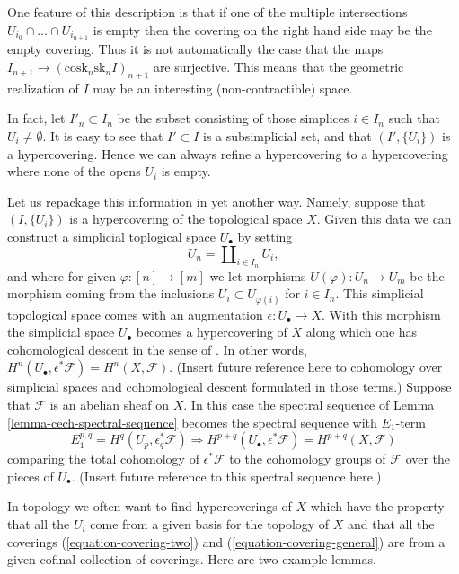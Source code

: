 \begin{remark}
\label{remark-not-covering-set}
One feature of this description is that if one of the multiple
intersections $U_{i_0} \cap \ldots \cap U_{i_{n + 1}}$ is empty then
the covering on the right hand side may be the empty covering.
Thus it is not automatically the case that the maps
$I_{n + 1} \to (\text{cosk}_n\text{sk}_n I)_{n + 1}$ are surjective.
This means that the geometric realization of $I$ may be an interesting
(non-contractible) space.

\medskip\noindent
In fact, let $I'_n \subset I_n$ be the subset
consisting of those simplices $i \in I_n$ such that
$U_i \not = \emptyset$. It is easy to see that $I' \subset I$
is a subsimplicial set, and that $(I', \{U_i\})$ is a hypercovering.
Hence we can always refine a hypercovering to a hypercovering where
none of the opens $U_i$ is empty.
\end{remark}

\begin{remark}
\label{remark-repackage-into-simplicial-space}
Let us repackage this information in yet another way.
Namely, suppose that $(I, \{U_i\})$ is a hypercovering of
the topological space $X$. Given this data we can construct
a simplicial toplogical space $U_\bullet$ by setting
$$
U_n = \coprod\nolimits_{i \in I_n} U_i,
$$
and where for given $\varphi : [n] \to [m]$ we let
morphisms $U(\varphi) : U_n \to U_m$ be the morphism
coming from the inclusions $U_i \subset U_{\varphi(i)}$
for $i \in I_n$. This simplicial topological space comes
with an augmentation $\epsilon : U_\bullet \to X$.
With this morphism the simplicial space $U_\bullet$ becomes
a hypercovering of $X$ along which one has cohomological descent
in the sense of \cite[Expos\'e Vbis]{SGA4}.
In other words, $H^n(U_\bullet, \epsilon^*\mathcal{F}) = H^n(X, \mathcal{F})$.
(Insert future reference here to cohomology over simplicial
spaces and cohomological descent formulated in those terms.)
Suppose that $\mathcal{F}$ is an abelian sheaf on $X$.
In this case the spectral sequence of Lemma \ref{lemma-cech-spectral-sequence}
becomes the spectral sequence with $E_1$-term
$$
E_1^{p, q} = H^q(U_p, \epsilon_q^*\mathcal{F})
\Rightarrow
H^{p + q}(U_\bullet, \epsilon^*\mathcal{F}) = H^{p + q}(X, \mathcal{F})
$$
comparing the total cohomology of $\epsilon^*\mathcal{F}$
to the cohomology groups of $\mathcal{F}$ over the pieces
of $U_\bullet$. (Insert future reference to this spectral sequence
here.)
\end{remark}

\noindent
In topology we often want to find hypercoverings of $X$ which
have the property that all the $U_i$ come from a given basis for the topology
of $X$ and that all the coverings
(\ref{equation-covering-two}) and (\ref{equation-covering-general})
are from a given cofinal collection of coverings.
Here are two example lemmas.

